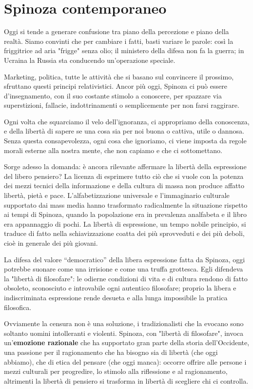 \chapter{Spinoza contemporaneo}

Oggi si tende a generare confusione tra piano della percezione e piano della realtà. Siamo convinti che per cambiare i fatti, basti variare le parole: così la friggitrice ad aria "frigge" senza olio; il ministero della difesa non fa la guerra; in Ucraina la Russia sta conducendo un'operazione speciale.

Marketing, politica, tutte le attività che si basano sul convincere il prossimo, sfruttano questi principi relativistici. Ancor più oggi, Spinoza ci può essere d'insegnamento, con il suo costante stimolo a conoscere, per spazzare via superstizioni, fallacie, indottrinamenti o semplicemente per non farsi raggirare.

Ogni volta che squarciamo il velo dell'ignoranza, ci appropriamo della conoscenza, e della libertà di sapere se una cosa sia per noi buona o cattiva, utile o dannosa. Senza questa consapevolezza, ogni cosa che ignoriamo, ci viene imposta da regole morali esterne alla nostra mente, che non capiamo e che ci sottomettano.

Sorge adesso la domanda: è ancora rilevante affermare la libertà della espressione del libero pensiero? La licenza di
esprimere tutto ciò che si vuole con la potenza dei mezzi tecnici della informazione e della
cultura di massa non produce affatto libertà, pietà e pace. L'alfabetizzazione universale e
l'immaginario culturale supportato dai mass media hanno
trasformato radicalmente la situazione rispetto ai tempi di Spinoza, quando la popolazione era in
prevalenza analfabeta e il libro era appannaggio di pochi. La libertà di espressione, un tempo nobile
principio, si traduce di fatto nella schiavizzazione coatta dei
più sprovveduti e dei più deboli, cioè in generale dei più giovani.

La difesa del valore
“democratico” della libera espressione fatta da Spinoza, oggi potrebbe suonare come una irrisione e come una truffa grottesca. Egli  difendeva la "libertà di filosofare": le
odierne condizioni di vita e di cultura rendono di fatto obsoleto, sconosciuto e introvabile
ogni autentico filosofare; proprio la libera e indiscriminata espressione
rende desueta e alla lunga impossibile la pratica filosofica.

Ovviamente la censura non è una soluzione, i tradizionalisti che la evocano sono soltanto uomini intolleranti e violenti. Spinoza, con "libertà di filosofare", invoca un'\textbf{emozione razionale} che ha supportato gran parte della storia
dell'Occidente, una passione per il ragionamento che ha bisogno sia di libertà (che oggi abbiamo), che di etica del pensare (che oggi manca): occorre offrire alle persone i mezzi culturali per progredire, lo stimolo alla riflessione e al ragionamento, altrimenti la libertà di pensiero si trasforma in libertà di scegliere chi ci controlla.

